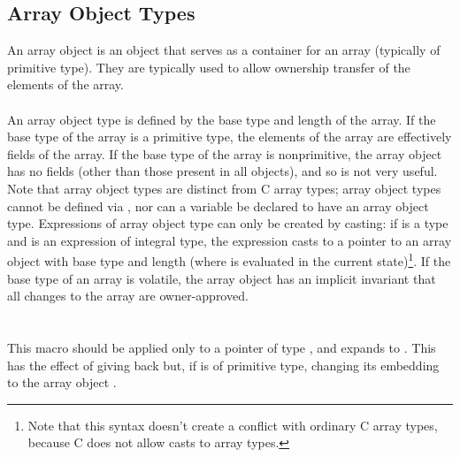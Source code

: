 \documentclass[preprint,nocopyrightspace]{sigplanconf}
\begin{document}
{{{\subsection{Array Object Types}
An array object is an object that serves as a container for an array
(typically of primitive type). They are typically used to allow
ownership transfer of the elements of the array.
\\\\
An array object type is defined by the base type and length of the
array. If the base type of the array is a primitive type, the elements
of the array are effectively fields of the array. If the base type of
the array is nonprimitive, the array object has no fields (other than
those present in all objects), and so is not very useful. Note that
array object types are distinct from C array
types; array object types cannot be defined via , nor can
a variable be declared to have an array object type. Expressions of
array object type can only be created by casting: if  is a type
and  is an expression of integral type, the
expression  casts  to a pointer to an array
object with base type  and length  (where  is
evaluated in the current state)\footnote{Note that this syntax doesn't
create a conflict with ordinary C array types, because C does not
allow casts to array types.}.
If the base type of an array is volatile, the array object has
an implicit invariant that all changes to the array are
owner-approved.
\\\\
\\
This macro should be applied only to a pointer  of type , and
expands to . This has the effect of giving
back  but, if  is of primitive type, changing its
embedding to the array object . 

}}}
\end{document}
